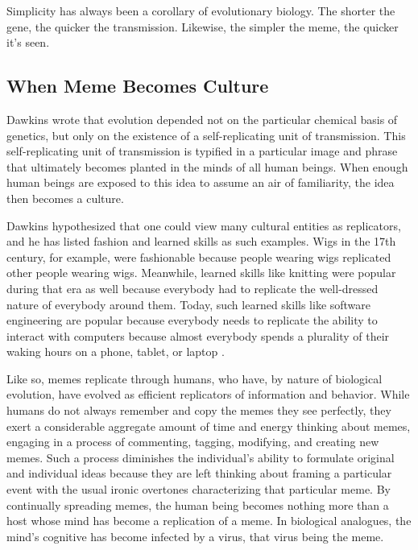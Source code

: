 \documentclass[12pt,letterpaper]{article}
\begin{document}
Simplicity has always been a corollary of evolutionary biology.  The shorter the gene, the quicker the transmission.  Likewise, the simpler the meme, the quicker it's seen.

\subsection{When Meme Becomes Culture}
Dawkins wrote that evolution depended not on the particular chemical basis of genetics, but only on the existence of a self-replicating unit of transmission.  This self-replicating unit of transmission is typified in a particular image and phrase that ultimately becomes planted in the minds of all human beings.  When enough human beings are exposed to this idea to assume an air of familiarity,  the idea then becomes a  culture.

Dawkins hypothesized that one could view many cultural entities as replicators, and he has listed fashion and learned skills as such examples.  Wigs in the 17th century, for example, were fashionable because people wearing wigs replicated other people wearing wigs.  Meanwhile, learned skills like knitting were popular during that era as well because everybody had to replicate the well-dressed nature of everybody around them.  Today, such learned skills like software engineering are popular because everybody needs to replicate the ability to interact with computers because almost everybody spends a plurality of their waking hours on a phone, tablet, or laptop \cite{noauthor_twitter_nodate}.


Like so, memes replicate through humans, who have, by nature of biological evolution, have evolved as efficient replicators of information and behavior. While humans do not always remember and copy the memes they see perfectly, they exert a considerable aggregate amount of time and energy thinking about memes, engaging in a process of commenting, tagging, modifying, and creating new memes.  Such a process diminishes the individual's ability to formulate original and individual ideas because they are left thinking about framing a particular event with the usual ironic overtones characterizing that particular meme.  By continually spreading memes, the human being becomes nothing more than a host whose mind has become a replication of a meme.  In biological analogues, the mind's cognitive has become infected by a virus, that virus being the meme.
\end{document}
